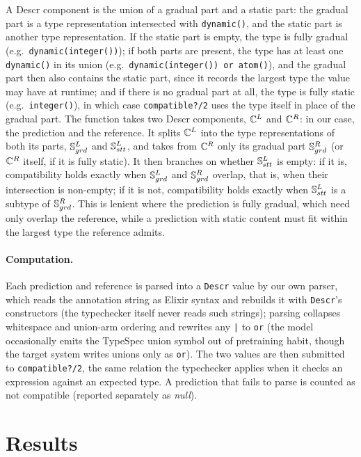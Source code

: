 A Descr component is the union of a gradual part and a static part: the gradual part is a type representation intersected with \texttt{dynamic()}, and the static part is another type representation.
If the static part is empty, the type is fully gradual (e.g.\ \texttt{dynamic(integer())}); if both parts are present, the type has at least one \texttt{dynamic()} in its union (e.g.\ \texttt{dynamic(integer()) or atom()}), and the gradual part then also contains the static part, since it records the largest type the value may have at runtime; and if there is no gradual part at all, the type is fully static (e.g.\ \texttt{integer()}), in which case \texttt{compatible?/2} uses the type itself in place of the gradual part.
The function takes two Descr components, $\mathbb{C}^L$ and $\mathbb{C}^R$: in our case, the prediction and the reference.
It splits $\mathbb{C}^L$ into the type representations of both its parts, $\mathbb{S}^L_{grd}$ and $\mathbb{S}^L_{stt}$, and takes from $\mathbb{C}^R$ only its gradual part $\mathbb{S}^R_{grd}$ (or $\mathbb{C}^R$ itself, if it is fully static).
It then branches on whether $\mathbb{S}^L_{stt}$ is empty: if it is, compatibility holds exactly when $\mathbb{S}^L_{grd}$ and $\mathbb{S}^R_{grd}$ overlap, that is, when their intersection is non-empty; if it is not, compatibility holds exactly when $\mathbb{S}^L_{stt}$ is a subtype of $\mathbb{S}^R_{grd}$.
This is lenient where the prediction is fully gradual, which need only overlap the reference, while a prediction with static content must fit within the largest type the reference admits.

\paragraph{Computation.}
Each prediction and reference is parsed into a \texttt{Descr} value by our own parser, which reads the annotation string as Elixir syntax and rebuilds it with \texttt{Descr}'s constructors (the typechecker itself never reads such strings); parsing collapses whitespace and union-arm ordering and rewrites any \texttt{|} to \texttt{or} (the model occasionally emits the TypeSpec union symbol out of pretraining habit, though the target system writes unions only as \texttt{or}).
The two values are then submitted to \texttt{compatible?/2}, the same relation the typechecker applies when it checks an expression against an expected type.
A prediction that fails to parse is counted as not compatible (reported separately as \emph{null}).

\section{Results}
\label{sec:llm-results}

